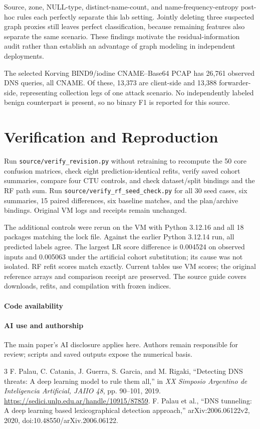 \documentclass[conference]{IEEEtran}
\newcommand{\code}[1]{\texttt{#1}}
\begin{document}
Source, zone, NULL-type, distinct-name-count, and name-frequency-entropy post-hoc rules each perfectly separate this lab setting. Jointly deleting three suspected graph proxies still leaves perfect classification, because remaining features also separate the same scenario. These findings motivate the residual-information audit rather than establish an advantage of graph modeling in independent deployments.

The selected Korving BIND9/iodine CNAME--Base64 PCAP has 26,761 observed DNS queries, all CNAME. Of these, 13,373 are client-side and 13,388 forwarder-side, representing collection legs of one attack scenario. No independently labeled benign counterpart is present, so no binary F1 is reported for this source.

\FloatBarrier
\newpage
\section{Verification and Reproduction}
Run \code{source/verify\_revision.py} without retraining to recompute the 50 core confusion matrices, check eight prediction-identical refits, verify saved cohort summaries, compare four CTU controls, and check dataset/split bindings and the RF path sum. Run \code{source/verify\_rf\_seed\_check.py} for all 30 seed cases, six summaries, 15 paired differences, six baseline matches, and the plan/archive bindings. Original VM logs and receipts remain unchanged.

The additional controls were rerun on the VM with Python 3.12.16 and all 18 packages matching the lock file. Against the earlier Python 3.12.14 run, all predicted labels agree. The largest LR score difference is 0.004524 on observed inputs and 0.005063 under the artificial cohort substitution; its cause was not isolated. RF refit scores match exactly. Current tables use VM scores; the original reference arrays and comparison receipt are preserved. The source guide covers downloads, refits, and compilation with frozen indices.

\paragraph{Code availability}


\paragraph{AI use and authorship}
The main paper's AI disclosure applies here. Authors remain responsible for review; scripts and saved outputs expose the numerical basis.

\begin{thebibliography}{3}
 F. Palau, C. Catania, J. Guerra, S. Garcia, and M. Rigaki, ``Detecting DNS threats: A deep learning model to rule them all,'' in \emph{XX Simposio Argentino de Inteligencia Artificial, JAIIO 48}, pp. 90--101, 2019. \url{https://sedici.unlp.edu.ar/handle/10915/87859}.
 F. Palau et al., ``DNS tunneling: A deep learning based lexicographical detection approach,'' arXiv:2006.06122v2, 2020, doi:10.48550/arXiv.2006.06122.
\end{thebibliography}
\end{document}
